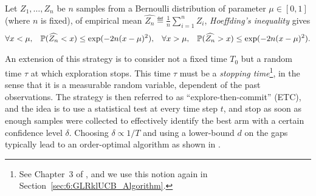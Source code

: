 %
\begin{lemma}\label{lem:2:HoeffdingInequality}
\begin{leftbar}[lemmabar]  %
    Let $Z_1,\dots,Z_n$ be $n$ \iid{} samples from a Bernoulli distribution of parameter $\mu\in[0,1]$ (where $n$ is fixed),
    of empirical mean $\widehat{Z_n} \eqdef \frac{1}{n} \sum_{i=1}^n Z_i$, \emph{Hoeffding's inequality} gives
    \vspace*{-5pt}  %
    \begin{align}\label{eq:2:HoeffdingInequality}
            \forall x < \mu, \;\;\; \mathbb{P}(\widehat{Z_n} < x) \leq \exp(-2 n (x-\mu)^2),
            \;\;\;
            \forall x > \mu, \;\;\; \mathbb{P}(\widehat{Z_n} > x) \leq \exp(-2 n (x-\mu)^2).
    \end{align}
    \vspace*{-5pt}  %
\end{leftbar}  %
\end{lemma}

An extension of this strategy is to consider not a fixed time $T_0$ but a random time $\tau$ at which exploration stops.
This time $\tau$ must be a \emph{stopping time}\footnote{See Chapter~3 of \cite{LattimoreBanditAlgorithmsBook}, and we use this notion again in Section~\ref{sec:6:GLRklUCB_Algorithm}.},
in the sense that it is a measurable random variable, dependent of the past observations. The strategy is then referred to as ``explore-then-commit'' (ETC), and the idea is to use a statistical test at every time step $t$, and stop as soon as enough samples were collected to effectively identify the best arm with a certain confidence level $\delta$.
Choosing $\delta \propto 1/T$ and using a lower-bound $d$ on the gaps typically lead to an order-optimal algorithm as shown in \cite{GarivierETC2016}.


